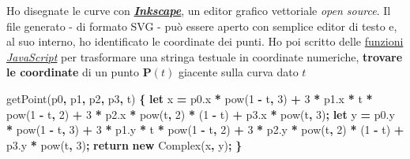\documentclass[
]{book}
\newenvironment{Shaded}{\begin{snugshade}}{\end{snugshade}}
\newcommand{\AttributeTok}[1]{\textcolor[rgb]{0.77,0.63,0.00}{#1}}
\newcommand{\ControlFlowTok}[1]{\textcolor[rgb]{0.13,0.29,0.53}{\textbf{#1}}}
\newcommand{\DecValTok}[1]{\textcolor[rgb]{0.00,0.00,0.81}{#1}}
\newcommand{\KeywordTok}[1]{\textcolor[rgb]{0.13,0.29,0.53}{\textbf{#1}}}
\newcommand{\NormalTok}[1]{#1}
\newcommand{\OperatorTok}[1]{\textcolor[rgb]{0.81,0.36,0.00}{\textbf{#1}}}
\newcommand{\VariableTok}[1]{\textcolor[rgb]{0.00,0.00,0.00}{#1}}
\begin{document}
Ho disegnate le curve con \href{https://inkscape.org/}{\emph{\textbf{Inkscape}}}, un editor grafico vettoriale \emph{open source}. Il file generato - di formato SVG - può essere aperto con semplice editor di testo e, al suo interno, ho identificato le coordinate dei punti. Ho poi scritto delle \href{https://github.com/Bradwave/thesis}{funzioni \emph{JavaScript}} per trasformare una stringa testuale in coordinate numeriche, \textbf{trovare le coordinate} di un punto \(\mathbf{P}(t)\) giacente sulla curva dato \(t\)

\begin{Shaded}
\begin{Highlighting}[]
\AttributeTok{getPoint}\NormalTok{(p0}\OperatorTok{,}\NormalTok{ p1}\OperatorTok{,}\NormalTok{ p2}\OperatorTok{,}\NormalTok{ p3}\OperatorTok{,}\NormalTok{ t) }\OperatorTok{\{}
        \KeywordTok{let}\NormalTok{ x }\OperatorTok{=} \VariableTok{p0}\NormalTok{.}\AttributeTok{x} \OperatorTok{*} \AttributeTok{pow}\NormalTok{(}\DecValTok{1} \OperatorTok{-}\NormalTok{ t}\OperatorTok{,} \DecValTok{3}\NormalTok{) }\OperatorTok{+} \DecValTok{3} \OperatorTok{*} \VariableTok{p1}\NormalTok{.}\AttributeTok{x} \OperatorTok{*}\NormalTok{ t }\OperatorTok{*} \AttributeTok{pow}\NormalTok{(}\DecValTok{1} \OperatorTok{-}\NormalTok{ t}\OperatorTok{,} \DecValTok{2}\NormalTok{)}
            \OperatorTok{+} \DecValTok{3} \OperatorTok{*} \VariableTok{p2}\NormalTok{.}\AttributeTok{x} \OperatorTok{*} \AttributeTok{pow}\NormalTok{(t}\OperatorTok{,} \DecValTok{2}\NormalTok{) }\OperatorTok{*}\NormalTok{ (}\DecValTok{1} \OperatorTok{-}\NormalTok{ t) }\OperatorTok{+} \VariableTok{p3}\NormalTok{.}\AttributeTok{x} \OperatorTok{*} \AttributeTok{pow}\NormalTok{(t}\OperatorTok{,} \DecValTok{3}\NormalTok{)}\OperatorTok{;}
        \KeywordTok{let}\NormalTok{ y }\OperatorTok{=} \VariableTok{p0}\NormalTok{.}\AttributeTok{y} \OperatorTok{*} \AttributeTok{pow}\NormalTok{(}\DecValTok{1} \OperatorTok{-}\NormalTok{ t}\OperatorTok{,} \DecValTok{3}\NormalTok{) }\OperatorTok{+} \DecValTok{3} \OperatorTok{*} \VariableTok{p1}\NormalTok{.}\AttributeTok{y} \OperatorTok{*}\NormalTok{ t }\OperatorTok{*} \AttributeTok{pow}\NormalTok{(}\DecValTok{1} \OperatorTok{-}\NormalTok{ t}\OperatorTok{,} \DecValTok{2}\NormalTok{)}
            \OperatorTok{+} \DecValTok{3} \OperatorTok{*} \VariableTok{p2}\NormalTok{.}\AttributeTok{y} \OperatorTok{*} \AttributeTok{pow}\NormalTok{(t}\OperatorTok{,} \DecValTok{2}\NormalTok{) }\OperatorTok{*}\NormalTok{ (}\DecValTok{1} \OperatorTok{-}\NormalTok{ t) }\OperatorTok{+} \VariableTok{p3}\NormalTok{.}\AttributeTok{y} \OperatorTok{*} \AttributeTok{pow}\NormalTok{(t}\OperatorTok{,} \DecValTok{3}\NormalTok{)}\OperatorTok{;}
        \ControlFlowTok{return} \KeywordTok{new} \AttributeTok{Complex}\NormalTok{(x}\OperatorTok{,}\NormalTok{ y)}\OperatorTok{;}
    \OperatorTok{\}}
\end{Highlighting}
\end{Shaded}
\end{document}
